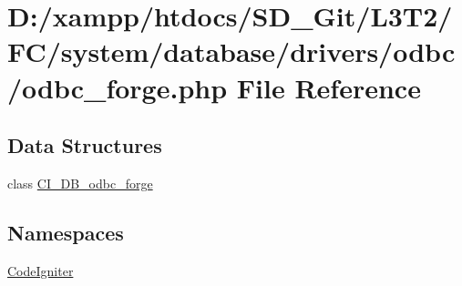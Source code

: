 \hypertarget{odbc__forge_8php}{}\section{D\+:/xampp/htdocs/\+S\+D\+\_\+\+Git/\+L3\+T2/\+F\+C/system/database/drivers/odbc/odbc\+\_\+forge.php File Reference}
\label{odbc__forge_8php}
\subsection*{Data Structures}
\begin{DoxyCompactItemize}
\item 
class \hyperlink{class_c_i___d_b__odbc__forge}{C\+I\+\_\+\+D\+B\+\_\+odbc\+\_\+forge}
\end{DoxyCompactItemize}
\subsection*{Namespaces}
\begin{DoxyCompactItemize}
\item 
 \hyperlink{namespace_code_igniter}{Code\+Igniter}
\end{DoxyCompactItemize}
